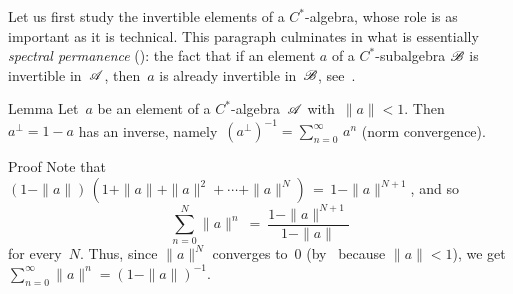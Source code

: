 \documentclass[main]{subfiles}
\begin{document}
%
%
\begin{parsec}%
\begin{point}%
Let us first study the invertible elements
of a $C^*$-algebra,
whose role 
is as important as it is technical.
This paragraph culminates in what is essentially
 \emph{spectral permanence} ():
the fact that if an element $a$ of a $C^*$-subalgebra $\mathscr{B}$
is invertible in~$\mathscr{A}$,
then~$a$ is already invertible in~$\mathscr{B}$,
see~.
\end{point}
\begin{point}[geometric]{Lemma}%
Let~$a$ be an element of a $C^*$-algebra~$\mathscr{A}$ with~$\|a\|<1$.
Then~$a^\perp=1-a$ has an inverse,
namely~$(a^\perp)^{-1}= \sum_{n=0}^\infty\, a^n$
(norm convergence).
\begin{point}{Proof}%
Note that
$(1-\|a\|)\,(1+\|a\|+\|a\|^2+\dotsb+\|a\|^N) \,=\, 1-\|a\|^{N+1}$,
and so 
\begin{equation*}
\sum_{n=0}^N \|a\|^n \ =\  \frac{1-\|a\|^{N+1}}{1-\|a\|}
\end{equation*}
for every~$N$.
Thus,
since $\|a\|^N$ converges to~$0$
(by~\TODO{} because $\|a\|<1$),
we  get $\sum_{n=0}^\infty \|a\|^n = (1-\|a\|)^{-1}$.


\end{point}
\end{point}
\end{parsec}
\end{document}
